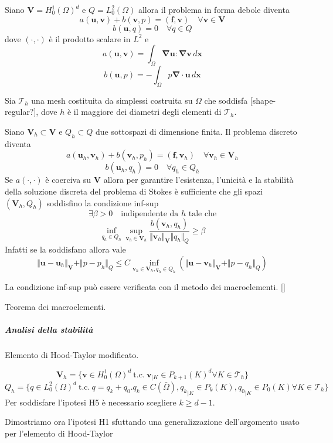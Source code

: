 \documentclass{book}
\newcommand{\Nabla}{\boldsymbol{\nabla}}
\newcommand{\tc}{\ \text{t.c.}\ }
\begin{document}
Siano $\mathbf{V}=H^1_0(\Omega)^d$ e $Q=L^2_0(\Omega)$ allora il problema in forma debole diventa
$$a(\mathbf{u},\mathbf{v})+b(\mathbf{v},p)=(\mathbf{f},\mathbf{v})\quad\forall\mathbf{v}\in\mathbf{V}$$
$$b(\mathbf{u},q)=0\quad\forall q\in Q$$
dove $(\cdot,\cdot)$ è il prodotto scalare in $L^2$ e
$$a(\mathbf{u},\mathbf{v})=\int_{\Omega}\Nabla\mathbf{u}\boldsymbol{:}\Nabla\mathbf{v}\,d\mathbf{x}$$
$$b(\mathbf{u},p)=-\int_{\Omega}p\Nabla\cdot\mathbf{u}\,d\mathbf{x}$$

Sia $\mathcal{T}_h$ una mesh costituita da simplessi costruita su $\Omega$ che soddisfa [shape-regular?], dove $h$ è il maggiore dei diametri degli elementi di $\mathcal{T}_h$.

Siano $\mathbf{V}_h\subset\mathbf{V}$ e $Q_h\subset Q$ due sottospazi di dimensione finita. Il problema discreto diventa
$$a(\mathbf{u}_h,\mathbf{v}_h)+b(\mathbf{v}_h,p_h)=(\mathbf{f},\mathbf{v}_h)\quad\forall\mathbf{v}_h\in\mathbf{V}_h$$
$$b(\mathbf{u}_h,q_h)=0\quad\forall q_h\in Q_h$$
Se $a(\cdot,\cdot)$ è coerciva su $\mathbf{V}$ allora per garantire l'esistenza, l'unicità e la stabilità della soluzione discreta del problema di Stokes è sufficiente che gli spazi $(\mathbf{V}_h,Q_h)$ soddisfino la condizione inf-sup
$$\exists\beta>0\quad\text{indipendente da $h$ tale che}$$
$$\inf_{q_h\in Q_h}\sup_{\mathbf{v}_h\in\mathbf{V}_h}\frac{b(\mathbf{v}_h,q_h)}{\Vert\mathbf{v}_h\Vert_{\mathbf{V}}\Vert q_h\Vert_{Q}}\geq\beta$$
Infatti se la soddisfano allora vale
$$\Vert\mathbf{u}-\mathbf{u}_h\Vert_{\mathbf{V}}+\Vert p - p_h \Vert_{Q}\leq C\inf_{\mathbf{v}_h\in\mathbf{V}_h,q_h\in Q_h}(\Vert\mathbf{u}-\mathbf{v}_h\Vert_{\mathbf{V}}+\Vert p - q_h \Vert_{Q})$$

La condizione inf-sup può essere verificata con il metodo dei macroelementi. []

Teorema dei macroelementi.

\subparagraph{Analisi della stabilità}

Elemento di Hood-Taylor modificato.

$$\mathbf{V}_h=\{\mathbf{v}\in H^1_0(\Omega)^d\tc\mathbf{v}_{\vert K}\in P_{k+1}(K)^d\forall K\in\mathcal{T}_h \}$$
$$Q_h=\{ q\in L^2_0(\Omega)^d\tc q=q_k+q_0. q_k\in C(\bar{\Omega}),{q_k}_{\vert K}\in P_k(K), {q_0}_{\vert K}\in P_0(K)\forall K\in\mathcal{T}_h \}$$
Per soddisfare l'ipotesi H5 è necessario scegliere $k\geq d-1$.

Dimostriamo ora l'ipotesi H1 sfuttando una generalizzazione dell'argomento usato per l'elemento di Hood-Taylor
\end{document}
